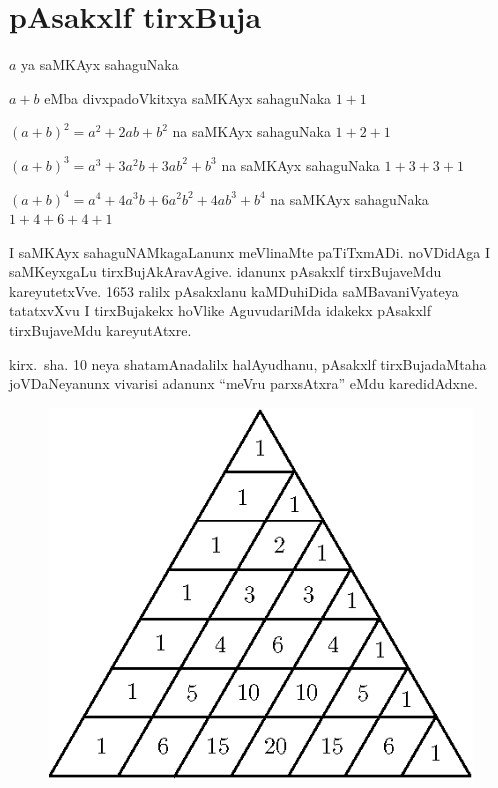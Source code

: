 \chapter{pAsakxlf tirxBuja}

\vskip -25pt
\noindent
$a$ ya saMKAyx sahaguNaka 

\noindent
$a+b$ eMba divxpadoVkitxya saMKAyx sahaguNaka \quad $1+1$

\noindent
$(a+b)^2=a^2+2ab+b^2$ na saMKAyx sahaguNaka \quad $1+2+1$

\noindent
$(a+b)^3=a^3+3a^2b+3ab^2+b^3$ na saMKAyx sahaguNaka \quad $1+3+3+1$

\noindent
$(a+b)^4=a^4+4a^3b+6a^2b^2+4ab^3+b^4$ na saMKAyx sahaguNaka \quad $1+4+6+4+1$

I saMKAyx sahaguNAMkagaLanunx meVlinaMte paTiTxmADi. noVDidAga I saMKeyxgaLu tirxBujAkAravAgive. idanunx pAsakxlf tirxBujaveMdu kareyutetxVve. {\rm 1653} ralilx pAsakxlanu kaMDuhiDida saMBavaniVyateya tatatxvXvu I tirxBujakekx hoVlike AguvudariMda idakekx pAsakxlf tirxBujaveMdu kareyutAtxre.

kirx.~sha. {\rm 10} neya shatamAnadalilx halAyudhanu, pAsakxlf tirxBujadaMtaha joVDaNe\-yanunx vivarisi adanunx ``meVru parxsAtxra'' eMdu karedidAdxne.
\hspace{2.5cm}
\begin{figure}[H]
\centering
\includegraphics[scale=.7]{src/figures/m_151.eps}
\end{figure}
\centerline{}

